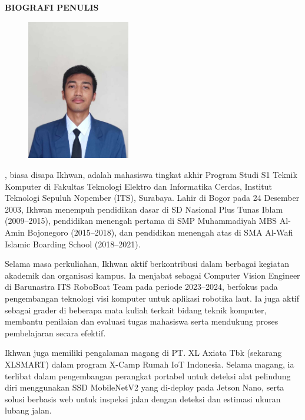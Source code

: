 \begin{center}
  \Large
  \textbf{BIOGRAFI PENULIS}
\end{center}


\vspace{2ex}

\begin{figure}
  \centering
  \vspace{-3ex}
  \includegraphics[width=0.4\textwidth]{gambar/foto-formal.jpeg}
  \vspace{-4ex}
\end{figure}

\name{}, biasa disapa Ikhwan, adalah mahasiswa tingkat akhir Program Studi S1 Teknik Komputer di Fakultas Teknologi Elektro dan Informatika Cerdas, Institut Teknologi Sepuluh Nopember (ITS), Surabaya. Lahir di Bogor pada 24 Desember 2003, Ikhwan menempuh pendidikan dasar di SD Nasional Plus Tunas Iblam (2009–2015), pendidikan menengah pertama di SMP Muhammadiyah MBS Al-Amin Bojonegoro (2015–2018), dan pendidikan menengah atas di SMA Al-Wafi Islamic Boarding School (2018–2021).

Selama masa perkuliahan, Ikhwan aktif berkontribusi dalam berbagai kegiatan akademik dan organisasi kampus. Ia menjabat sebagai Computer Vision Engineer di Barunastra ITS RoboBoat Team pada periode 2023–2024, berfokus pada pengembangan teknologi visi komputer untuk aplikasi robotika laut. Ia juga aktif sebagai grader di beberapa mata kuliah terkait bidang teknik komputer, membantu penilaian dan evaluasi tugas mahasiswa serta mendukung proses pembelajaran secara efektif.

Ikhwan juga memiliki pengalaman magang di PT. XL Axiata Tbk (sekarang XLSMART) dalam program X-Camp Rumah IoT Indonesia. Selama magang, ia terlibat dalam pengembangan perangkat portabel untuk deteksi alat pelindung diri menggunakan SSD MobileNetV2 yang di-deploy pada Jetson Nano, serta solusi berbasis web untuk inspeksi jalan dengan deteksi dan estimasi ukuran lubang jalan.

